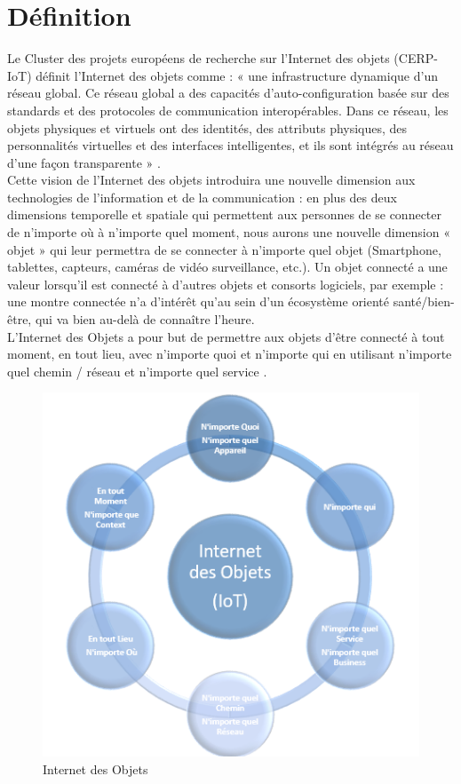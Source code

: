 	\section{Déf{\kern0pt}inition}
	Le Cluster des projets européens de recherche sur l'Internet des objets (CERP-IoT) déf{\kern0pt}init l’Internet des objets comme : « une infrastructure dynamique d’un réseau global. Ce réseau global a des capacités d’auto-conf{\kern0pt}iguration basée sur des standards et des protocoles de communication interopérables. Dans ce réseau, les objets physiques et virtuels ont des identités, des attributs physiques, des personnalités virtuelles et des interfaces intelligentes, et ils sont intégrés au réseau d’une façon transparente » \cite{sundmaeker2010vision}.\\
Cette vision de l’Internet des objets introduira une nouvelle dimension aux technologies de l’information et de la communication : en plus des deux dimensions temporelle et spatiale qui permettent aux personnes de se connecter de n’importe où à n’importe quel moment, nous aurons une nouvelle dimension « objet » qui leur permettra de se connecter à n’importe quel objet \cite{challal2012securite} (Smartphone, tablettes, capteurs, caméras de vidéo surveillance, etc.). Un objet connecté a une valeur lorsqu’il est connecté à d’autres objets et consorts logiciels, par exemple : une montre connectée n’a d’intérêt qu’au sein d’un écosystème orienté santé/bien-être, qui va bien au-delà de connaître l’heure.\\
	L’Internet des Objets a pour but de permettre aux objets d’être connecté à tout moment, en tout lieu, avec n’importe quoi et n’importe qui en utilisant n’importe quel chemin / réseau et n’importe quel service \cite{patel2016iot}.\\
	
	\begin{figure}[H]
		\begin{center}
			\includegraphics{IMAGES/ORIGINALS/Internet_des_Objets}
		\end{center}
		\caption{Internet des Objets}
	\end{figure}


